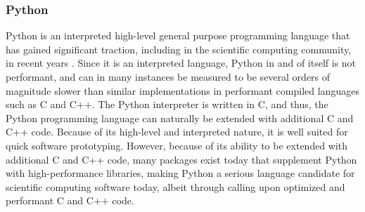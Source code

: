 \subsubsection{Python} \label{background:implementation_tools_and_libraries:python}
Python is an interpreted high-level general purpose programming language that has gained significant traction, including in the scientific computing community, in recent years \cite{python,python_popular}.
Since it is an interpreted language, Python in and of itself is not performant, and can in many instances be measured to be several orders of magnitude slower than similar implementations in performant compiled languages such as C and C++.
The Python interpreter is written in C, and thus, the Python programming language can naturally be extended with additional C and C++ code.
Because of its high-level and interpreted nature, it is well suited for quick software prototyping.
However, because of its ability to be extended with additional C and C++ code, many packages exist today that supplement Python with high-performance libraries, making Python a serious language candidate for scientific computing software today, albeit through calling upon optimized and performant C and C++ code.
